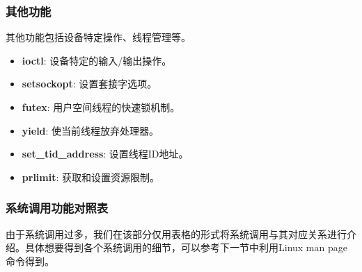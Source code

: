 \subsubsection{其他功能}
其他功能包括设备特定操作、线程管理等。
\begin{itemize}
    \item \textbf{ioctl}: 设备特定的输入/输出操作。
    \item \textbf{setsockopt}: 设置套接字选项。
    \item \textbf{futex}: 用户空间线程的快速锁机制。
    \item \textbf{yield}: 使当前线程放弃处理器。
    \item \textbf{set\_tid\_address}: 设置线程ID地址。
    \item \textbf{prlimit}: 获取和设置资源限制。
\end{itemize}
\subsubsection{系统调用功能对照表}
由于系统调用过多，我们在该部分仅用表格的形式将系统调用与其对应关系进行介绍。具体想要得到各个系统调用的细节，可以参考下一节中利用Linux man page命令得到。

